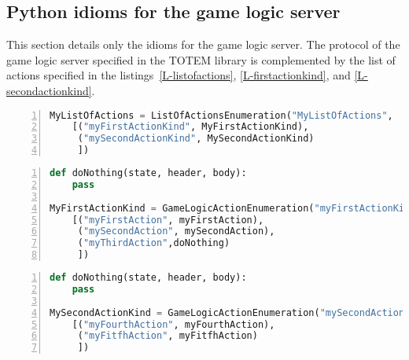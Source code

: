 

\subsection{Python idioms for the game logic server}
\label{SS_api_python}

This section details only the idioms for the game logic server. The protocol 
of the game logic server specified in the TOTEM library is
complemented by the list of actions specified in the listings~\ref{L-listofactions}, \ref{L-firstactionkind}, and \ref{L-secondactionkind}.

\begin{lstlisting}[float=htbp,frame=bt,basicstyle=\scriptsize\sffamily,numbers=left,
   numberstyle=\tiny, stepnumber=1,
    numbersep=5pt,language=python,label=L-listofactions,caption=List of action kinds of the state machine for the game logic server]
MyListOfActions = ListOfActionsEnumeration("MyListOfActions",
    [("myFirstActionKind", MyFirstActionKind),
     ("mySecondActionKind", MySecondActionKind)
     ])
\end{lstlisting}

\begin{lstlisting}[float=htbp,frame=bt,basicstyle=\scriptsize\sffamily,numbers=left,
   numberstyle=\tiny, stepnumber=1,
    numbersep=5pt,language=python,label=L-firstactionkind,caption=Game logic server's actions of the first action kinds]
def doNothing(state, header, body):
    pass

MyFirstActionKind = GameLogicActionEnumeration("myFirstActionKind", 100, 0, 1000,
    [("myFirstAction", myFirstAction),
     ("mySecondAction", mySecondAction),
     ("myThirdAction",doNothing)
     ])
\end{lstlisting}

\begin{lstlisting}[float=htbp,frame=bt,basicstyle=\scriptsize\sffamily,numbers=left,
   numberstyle=\tiny, stepnumber=1,
    numbersep=5pt,language=python,label=L-secondactionkind,caption=Game logic server's actions of the second action kinds]
def doNothing(state, header, body):
    pass

MySecondActionKind = GameLogicActionEnumeration("mySecondActionKind", 101, 0, 1000,
    [("myFourthAction", myFourthAction),
     ("myFitfhAction", myFitfhAction)
     ])
\end{lstlisting}


